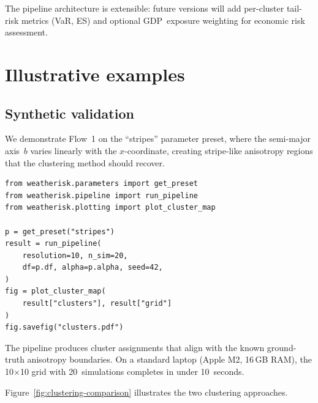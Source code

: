 \documentclass[a4paper]{elsarticle}
\begin{document}
The pipeline architecture is extensible: future versions will add
per-cluster tail-risk metrics (VaR, ES) and optional GDP~exposure
weighting for economic risk assessment.

\section{Illustrative examples}
\label{sec:examples}

\subsection{Synthetic validation}

We demonstrate Flow~1 on the ``stripes'' parameter preset, where the
semi-major axis~$b$ varies linearly with the $x$-coordinate, creating
stripe-like anisotropy regions that the clustering method should recover.

\begin{lstlisting}[caption={Python API usage for synthetic validation.},label=lst:api]
from weatherisk.parameters import get_preset
from weatherisk.pipeline import run_pipeline
from weatherisk.plotting import plot_cluster_map

p = get_preset("stripes")
result = run_pipeline(
    resolution=10, n_sim=20,
    df=p.df, alpha=p.alpha, seed=42,
)
fig = plot_cluster_map(
    result["clusters"], result["grid"]
)
fig.savefig("clusters.pdf")
\end{lstlisting}

The pipeline produces cluster assignments that align with the known
ground-truth anisotropy boundaries.
On a standard laptop (Apple M2, 16\,GB RAM), the 10$\times$10 grid
with 20~simulations completes in under 10~seconds.

Figure~\ref{fig:clustering-comparison} illustrates the two clustering
approaches.
\end{document}
